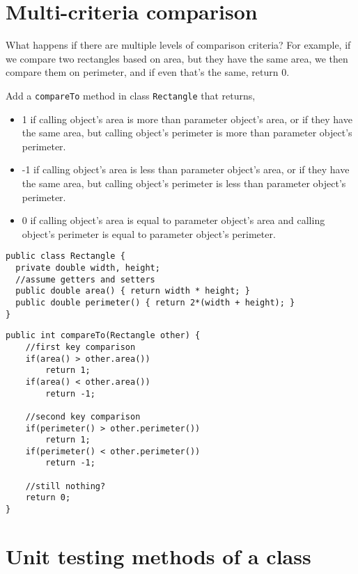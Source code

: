 \section{Multi-criteria comparison}
  What happens if there are multiple levels of comparison criteria? For example, if we compare two rectangles based on area, but they have the same area, we then compare them on perimeter, and if even that's the same, return 0. 

\begin{exercise}
Add a \texttt{compareTo} method in class \texttt{Rectangle} that returns,

\begin{itemize}
\item 1 if calling object's area is more than parameter object's area, or if they have the same area, but calling object's perimeter is more than parameter object's perimeter.
\item -1 if calling object's area is less than parameter object's area, or if they have the same area, but calling object's perimeter is less than parameter object's perimeter.
\item 0 if calling object's area is equal to parameter object's area and calling object's perimeter is equal to parameter object's perimeter. 
\end{itemize}
\begin{lstlisting}[frame=single,style=buggy]
public class Rectangle {
  private double width, height;
  //assume getters and setters
  public double area() { return width * height; }
  public double perimeter() { return 2*(width + height); }
}
\end{lstlisting}  	
\end{exercise}
\begin{answer} \begin{lstlisting}
public int compareTo(Rectangle other) {
	//first key comparison
	if(area() > other.area())
		return 1;
	if(area() < other.area())
		return -1;
	
	//second key comparison
	if(perimeter() > other.perimeter())
		return 1;
	if(perimeter() < other.perimeter())
		return -1;
	
	//still nothing?
	return 0;
}
\end{lstlisting} \end{answer}

\section{Unit testing methods of a class}

